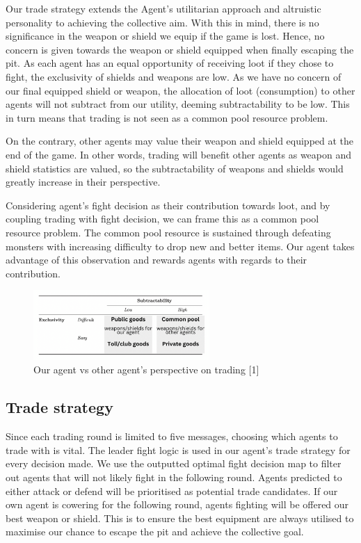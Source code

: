 Our trade strategy extends the Agent's utilitarian approach and altruistic personality to achieving the collective aim. With this in mind, there is no significance in the weapon or shield we equip if the game is lost. Hence, no concern is given towards the weapon or shield equipped when finally escaping the pit. As each agent has an equal opportunity of receiving loot if they chose to fight, the exclusivity of shields and weapons are low. As we have no concern of our final equipped shield or weapon, the allocation of loot (consumption) to other agents will not subtract from our utility, deeming subtractability to be low. This in turn means that trading is not seen as a common pool resource problem.

On the contrary, other agents may value their weapon and shield equipped at the end of the game. In other words, trading will benefit other agents as weapon and shield statistics are valued, so the subtractability of weapons and shields would greatly increase in their perspective.

Considering agent's fight decision as their contribution towards loot, and by coupling trading with fight decision, we can frame this as a common pool resource problem. The common pool resource is sustained through defeating monsters with increasing difficulty to drop new and better items. Our agent takes advantage of this observation and rewards agents with regards to their contribution.

\begin{figure}[!ht]
    \centering
    \includegraphics[width=0.60\textwidth]{008_team_5_agent_design/images/13.png}
    \caption{Our agent vs other agent's perspective on trading [1]}
    \label{13}
\end{figure}

\subsection{Trade strategy}
Since each trading round is limited to five messages, choosing which agents to trade with is vital. The leader fight logic is used in our agent's trade strategy for every decision made. We use the outputted optimal fight decision map to filter out agents that will not likely fight in the following round. Agents predicted to either attack or defend will be prioritised as potential trade candidates. If our own agent is cowering for the following round, agents fighting will be offered our best weapon or shield. This is to ensure the best equipment are always utilised to maximise our chance to escape the pit and achieve the collective goal.

